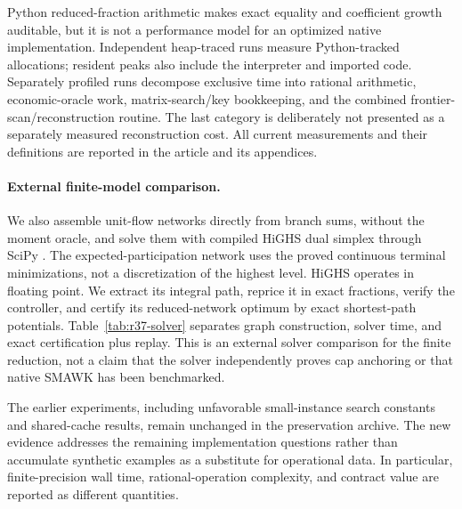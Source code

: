 

Python reduced-fraction arithmetic makes exact equality and coefficient growth auditable, but it is not a performance model for an optimized native implementation. Independent heap-traced runs measure Python-tracked allocations; resident peaks also include the interpreter and imported code. Separately profiled runs decompose exclusive time into rational arithmetic, economic-oracle work, matrix-search/key bookkeeping, and the combined frontier-scan/reconstruction routine. The last category is deliberately not presented as a separately measured reconstruction cost. All current measurements and their definitions are reported in the article and its appendices.

\paragraph{External finite-model comparison.}
We also assemble unit-flow networks directly from branch sums, without the moment oracle, and solve them with compiled HiGHS dual simplex through SciPy \citep{HuangfuHall2018,Virtanen2020}. The expected-participation network uses the proved continuous terminal minimizations, not a discretization of the highest level. HiGHS operates in floating point. We extract its integral path, reprice it in exact fractions, verify the controller, and certify its reduced-network optimum by exact shortest-path potentials. Table~\ref{tab:r37-solver} separates graph construction, solver time, and exact certification plus replay. This is an external solver comparison for the finite reduction, not a claim that the solver independently proves cap anchoring or that native SMAWK has been benchmarked.

The earlier experiments, including unfavorable small-instance search constants and shared-cache results, remain unchanged in the preservation archive. The new evidence addresses the remaining implementation questions rather than accumulate synthetic examples as a substitute for operational data. In particular, finite-precision wall time, rational-operation complexity, and contract value are reported as different quantities.
